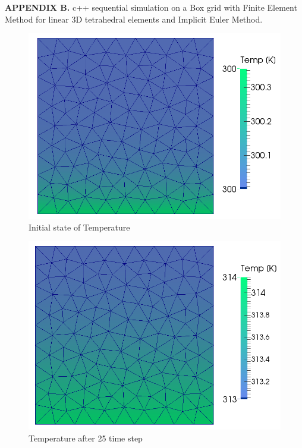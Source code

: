 \documentclass[12pt]{article}
\begin{document}
	
\textbf{APPENDIX B.} c++ sequential simulation on a Box grid with Finite Element Method for linear 3D tetrahedral elements and Implicit Euler Method.
	
	\begin{figure}[H]
    \includegraphics[scale=0.4]{box-sequential/boxSequential_ts1.png}
    \centering
    \caption{Initial state of Temperature}
	\end{figure}	
	\begin{figure}[H]
    \includegraphics[scale=0.4]{box-sequential/boxSequential_ts25.png}
    \centering
    \caption{Temperature after 25 time step}
	\end{figure}	
\end{document}
